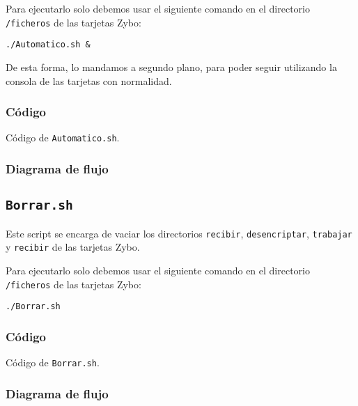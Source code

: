 \documentclass[12pt,letterpaper]{article}
\begin{document}
Para ejecutarlo solo debemos usar el siguiente comando en el directorio \texttt{/ficheros} de las tarjetas Zybo:
\begin{center}
	\texttt{./Automatico.sh \&}
\end{center}

De esta forma, lo mandamos a segundo plano, para poder seguir utilizando la consola de las tarjetas con normalidad.

\subsubsection{Código}

\begin{center}
	Código de \texttt{Automatico.sh}.
\end{center}

\subsubsection{Diagrama de flujo}



\subsection{\texttt{Borrar.sh}}
Este script se encarga de vaciar los directorios \texttt{recibir}, \texttt{desencriptar}, \texttt{trabajar} y \texttt{recibir} de las tarjetas Zybo.

Para ejecutarlo solo debemos usar el siguiente comando en el directorio \texttt{/ficheros} de las tarjetas Zybo:
\begin{center}
	\texttt{./Borrar.sh}
\end{center}

\subsubsection{Código}

\begin{center}
	Código de \texttt{Borrar.sh}.
\end{center}

\subsubsection{Diagrama de flujo}



\end{document}

